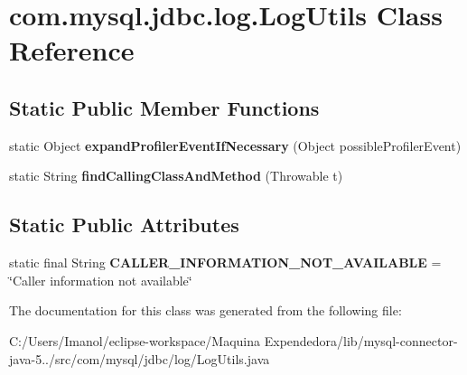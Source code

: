 \hypertarget{classcom_1_1mysql_1_1jdbc_1_1log_1_1_log_utils}{}\section{com.\+mysql.\+jdbc.\+log.\+Log\+Utils Class Reference}
\label{classcom_1_1mysql_1_1jdbc_1_1log_1_1_log_utils}
\subsection*{Static Public Member Functions}
\begin{DoxyCompactItemize}
\item 
\mbox{\label{classcom_1_1mysql_1_1jdbc_1_1log_1_1_log_utils_a8010703186d8c32aeed97a173440d634}} 
static Object {\bfseries expand\+Profiler\+Event\+If\+Necessary} (Object possible\+Profiler\+Event)
\item 
\mbox{\label{classcom_1_1mysql_1_1jdbc_1_1log_1_1_log_utils_a635eb1e58401ded008f38c347f1bdeb1}} 
static String {\bfseries find\+Calling\+Class\+And\+Method} (Throwable t)
\end{DoxyCompactItemize}
\subsection*{Static Public Attributes}
\begin{DoxyCompactItemize}
\item 
\mbox{\label{classcom_1_1mysql_1_1jdbc_1_1log_1_1_log_utils_aa6491954bf59b0cf161615d12784d92b}} 
static final String {\bfseries C\+A\+L\+L\+E\+R\+\_\+\+I\+N\+F\+O\+R\+M\+A\+T\+I\+O\+N\+\_\+\+N\+O\+T\+\_\+\+A\+V\+A\+I\+L\+A\+B\+LE} = \char`\"{}Caller information not available\char`\"{}
\end{DoxyCompactItemize}


The documentation for this class was generated from the following file\+:\begin{DoxyCompactItemize}
\item 
C\+:/\+Users/\+Imanol/eclipse-\/workspace/\+Maquina Expendedora/lib/mysql-\/connector-\/java-\/5../src/com/mysql/jdbc/log/Log\+Utils.\+java\end{DoxyCompactItemize}
